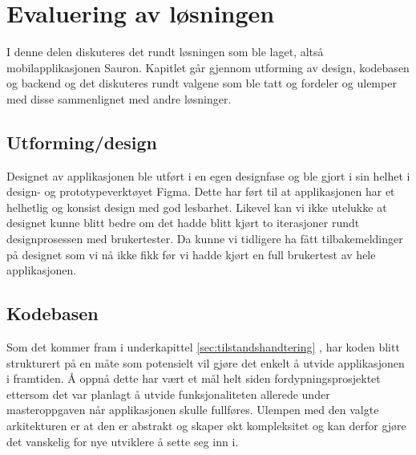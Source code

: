 \chapter{Evaluering av løsningen}
I denne delen diskuteres det rundt løsningen som ble laget, altså mobilapplikasjonen Sauron. Kapitlet går gjennom utforming av design, kodebasen og backend og det diskuteres rundt valgene som ble tatt og fordeler og ulemper med disse sammenlignet med andre løsninger.

\section{Utforming/design}
Designet av applikasjonen ble utført i en egen designfase og ble gjort i sin helhet i design- og prototypeverktøyet Figma. Dette har ført til at applikasjonen har et helhetlig og konsist design med god lesbarhet. Likevel kan vi ikke utelukke at designet kunne blitt bedre om det hadde blitt kjørt to iterasjoner rundt designprosessen med brukertester. Da kunne vi tidligere ha fått tilbakemeldinger på designet som vi nå ikke fikk før vi hadde kjørt en full brukertest av hele applikasjonen.

\section{Kodebasen}
Som det kommer fram i underkapittel \ref{sec:tilstandshandtering} , har koden blitt strukturert på en måte som potensielt vil gjøre det enkelt å utvide applikasjonen i framtiden. Å oppnå dette har vært et mål helt siden fordypningsprosjektet ettersom det var planlagt å utvide funksjonaliteten allerede under masteroppgaven når applikasjonen skulle fullføres. Ulempen med den valgte arkitekturen er at den er abstrakt og skaper økt kompleksitet og kan derfor gjøre det vanskelig for nye utviklere å sette seg inn i.
\newline


